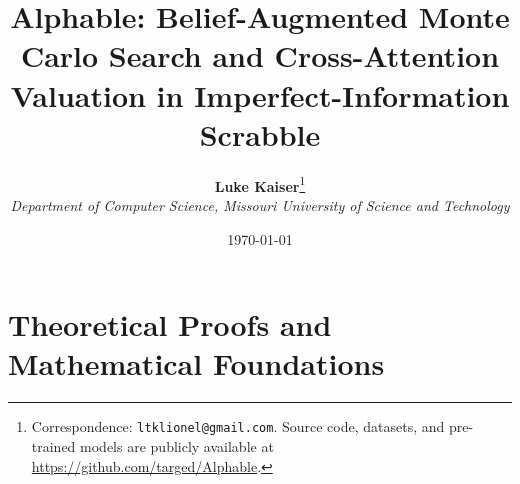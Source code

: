 \documentclass[11pt,letterpaper]{article}
\title{\textbf{Alphable: Belief-Augmented Monte Carlo Search and Cross-Attention Valuation in Imperfect-Information Scrabble}}
\author{
  \textbf{Luke Kaiser}\thanks{Correspondence: \texttt{ltklionel@gmail.com}. Source code, datasets, and pre-trained models are publicly available at \url{https://github.com/targed/Alphable}.} \\
  \textit{Department of Computer Science, Missouri University of Science and Technology}
}
\date{\today}
\begin{document}
\maketitle









\clearpage







\clearpage
\appendix
\section{Theoretical Proofs and Mathematical Foundations}


\end{document}
